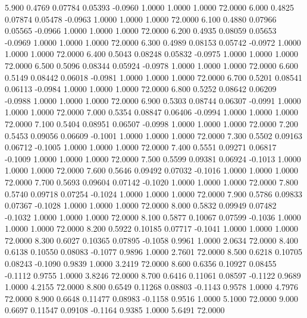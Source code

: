    5.900   0.4769   0.07784   0.05393  -0.0960   1.0000   1.0000   1.0000  72.0000
   6.000   0.4825   0.07874   0.05478  -0.0963   1.0000   1.0000   1.0000  72.0000
   6.100   0.4880   0.07966   0.05565  -0.0966   1.0000   1.0000   1.0000  72.0000
   6.200   0.4935   0.08059   0.05653  -0.0969   1.0000   1.0000   1.0000  72.0000
   6.300   0.4989   0.08153   0.05742  -0.0972   1.0000   1.0000   1.0000  72.0000
   6.400   0.5043   0.08248   0.05832  -0.0975   1.0000   1.0000   1.0000  72.0000
   6.500   0.5096   0.08344   0.05924  -0.0978   1.0000   1.0000   1.0000  72.0000
   6.600   0.5149   0.08442   0.06018  -0.0981   1.0000   1.0000   1.0000  72.0000
   6.700   0.5201   0.08541   0.06113  -0.0984   1.0000   1.0000   1.0000  72.0000
   6.800   0.5252   0.08642   0.06209  -0.0988   1.0000   1.0000   1.0000  72.0000
   6.900   0.5303   0.08744   0.06307  -0.0991   1.0000   1.0000   1.0000  72.0000
   7.000   0.5354   0.08847   0.06406  -0.0994   1.0000   1.0000   1.0000  72.0000
   7.100   0.5404   0.08951   0.06507  -0.0998   1.0000   1.0000   1.0000  72.0000
   7.200   0.5453   0.09056   0.06609  -0.1001   1.0000   1.0000   1.0000  72.0000
   7.300   0.5502   0.09163   0.06712  -0.1005   1.0000   1.0000   1.0000  72.0000
   7.400   0.5551   0.09271   0.06817  -0.1009   1.0000   1.0000   1.0000  72.0000
   7.500   0.5599   0.09381   0.06924  -0.1013   1.0000   1.0000   1.0000  72.0000
   7.600   0.5646   0.09492   0.07032  -0.1016   1.0000   1.0000   1.0000  72.0000
   7.700   0.5693   0.09604   0.07142  -0.1020   1.0000   1.0000   1.0000  72.0000
   7.800   0.5740   0.09718   0.07254  -0.1024   1.0000   1.0000   1.0000  72.0000
   7.900   0.5786   0.09833   0.07367  -0.1028   1.0000   1.0000   1.0000  72.0000
   8.000   0.5832   0.09949   0.07482  -0.1032   1.0000   1.0000   1.0000  72.0000
   8.100   0.5877   0.10067   0.07599  -0.1036   1.0000   1.0000   1.0000  72.0000
   8.200   0.5922   0.10185   0.07717  -0.1041   1.0000   1.0000   1.0000  72.0000
   8.300   0.6027   0.10365   0.07895  -0.1058   0.9961   1.0000   2.0634  72.0000
   8.400   0.6138   0.10550   0.08083  -0.1077   0.9896   1.0000   2.7601  72.0000
   8.500   0.6218   0.10705   0.08243  -0.1090   0.9839   1.0000   3.2419  72.0000
   8.600   0.6356   0.10927   0.08455  -0.1112   0.9755   1.0000   3.8246  72.0000
   8.700   0.6416   0.11061   0.08597  -0.1122   0.9689   1.0000   4.2155  72.0000
   8.800   0.6549   0.11268   0.08803  -0.1143   0.9578   1.0000   4.7976  72.0000
   8.900   0.6648   0.11477   0.08983  -0.1158   0.9516   1.0000   5.1000  72.0000
   9.000   0.6697   0.11547   0.09108  -0.1164   0.9385   1.0000   5.6491  72.0000
